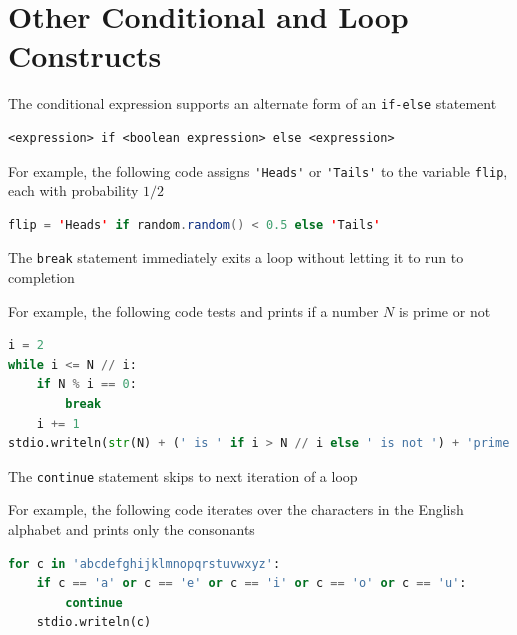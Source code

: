 \documentclass[8pt,a4paper,compress]{beamer}
\begin{document}
\section{Other Conditional and Loop Constructs}
\begin{frame}[fragile]
\pause

The conditional expression supports an alternate form of an \lstinline$if-else$ statement
 
\begin{lstlisting}[language={}]
<expression> if <boolean expression> else <expression>
\end{lstlisting}

For example, the following code assigns \lstinline{'Heads'} or \lstinline{'Tails'} to the variable \lstinline{flip}, each with probability $1/2$

\begin{lstlisting}[language=Java]
flip = 'Heads' if random.random() < 0.5 else 'Tails'
\end{lstlisting}

\pause
\bigskip

The \lstinline{break} statement immediately exits a loop without letting it to run to completion

\pause
\bigskip

For example, the following code tests and prints if a number $N$ is prime or not
\begin{lstlisting}[language=Python]
i = 2
while i <= N // i:
    if N % i == 0:
        break
    i += 1
stdio.writeln(str(N) + (' is ' if i > N // i else ' is not ') + 'prime')
\end{lstlisting}

\pause
\bigskip

The \lstinline{continue} statement skips to next iteration of a loop

\pause
\bigskip

For example, the following code iterates over the characters in the English alphabet and prints only the consonants
\begin{lstlisting}[language=Python]
for c in 'abcdefghijklmnopqrstuvwxyz':
    if c == 'a' or c == 'e' or c == 'i' or c == 'o' or c == 'u':
        continue
    stdio.writeln(c)
\end{lstlisting}
\end{frame}
\end{document}
